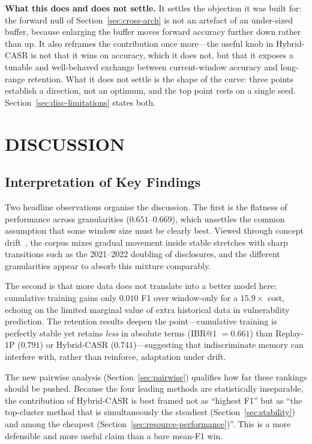 \documentclass[a4paper,twoside]{article}
\begin{document}
\textbf{What this does and does not settle.} It settles the objection it was built for: the forward null of Section~\ref{sec:cross-arch} is not an artefact of an under-sized buffer, because enlarging the buffer moves forward accuracy further down rather than up. It also reframes the contribution once more---the useful knob in Hybrid-CASR is not that it wins on accuracy, which it does not, but that it exposes a tunable and well-behaved exchange between current-window accuracy and long-range retention. What it does not settle is the shape of the curve: three points establish a direction, not an optimum, and the top point rests on a single seed. Section~\ref{sec:disc-limitations} states both.

\section{\uppercase{Discussion}}
\label{sec:discussion}

\subsection{Interpretation of Key Findings}
\label{sec:disc-interpretation}

\noindent
Two headline observations organise the discussion. The first is the flatness of performance across granularities ($0.651$--$0.669$), which unsettles the common assumption that some window size must be clearly best. Viewed through concept drift~\citep{Hinder2024ConceptDrift}, the corpus mixes gradual movement inside stable stretches with sharp transitions such as the 2021--2022 doubling of disclosures, and the different granularities appear to absorb this mixture comparably.

The second is that more data does not translate into a better model here: cumulative training gains only $0.010$ F1 over window-only for a $15.9\times$ cost, echoing \citet{Morrison2015HotSOS} on the limited marginal value of extra historical data in vulnerability prediction. The retention results deepen the point---cumulative training is perfectly stable yet retains \emph{less} in absolute terms (IBR@1 $=0.661$) than Replay-1P ($0.791$) or Hybrid-CASR ($0.741$)---suggesting that indiscriminate memory can interfere with, rather than reinforce, adaptation under drift.

The new pairwise analysis (Section~\ref{sec:pairwise}) qualifies how far these rankings should be pushed. Because the four leading methods are statistically inseparable, the contribution of Hybrid-CASR is best framed not as ``highest F1'' but as ``the top-cluster method that is simultaneously the steadiest (Section~\ref{sec:stability}) and among the cheapest (Section~\ref{sec:resource-performance})''. This is a more defensible and more useful claim than a bare mean-F1 win.
\end{document}
